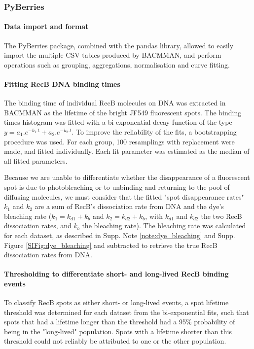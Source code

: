 \subsubsection*{PyBerries}
\paragraph*{Data import and format}
The PyBerries package, combined with the pandas library, allowed to easily import the multiple CSV tables produced by BACMMAN, and perform operations such as grouping, aggregations, normalisation and curve fitting.

\paragraph*{Fitting RecB DNA binding times}
The binding time of individual RecB molecules on DNA was extracted in BACMMAN as the lifetime of the bright JF549 fluorescent spots. The binding times histogram was fitted with a bi-exponential decay function of the type $y=a_1.e^{-k_1.t} + a_2.e^{-k_2.t}$. To improve the reliability of the fits, a bootstrapping procedure was used. For each group, 100 resamplings with replacement were made, and fitted individually. Each fit parameter was estimated as the median of all fitted parameters.

Because we are unable to differentiate whether the disappearance of a fluorescent spot is due to photobleaching or to unbinding and returning to the pool of diffusing molecules, we must consider that the fitted "spot disappearance rates" $k_1$ and $k_2$ are a sum of RecB's dissociation rate from DNA and the dye's bleaching rate ($k_1=k_{d1}+k_b$ and $k_2=k_{d2}+k_b$, with $k_{d1}$ and $k_{d2}$ the two RecB dissociation rates, and $k_b$ the bleaching rate). The bleaching rate was calculated for each dataset, as described in Supp. Note \ref{note:dye_bleaching} and Supp. Figure \ref{SIFig:dye_bleaching} and subtracted to retrieve the true RecB dissociation rates from DNA.

\paragraph*{Thresholding to differentiate short- and long-lived RecB binding events}
To classify RecB spots as either short- or long-lived events, a spot lifetime threshold was determined for each dataset from the bi-exponential fits, such that spots that had a lifetime longer than the threshold had a 95\% probability of being in the "long-lived" population. Spots with a lifetime shorter than this threshold could not reliably be attributed to one or the other population.

